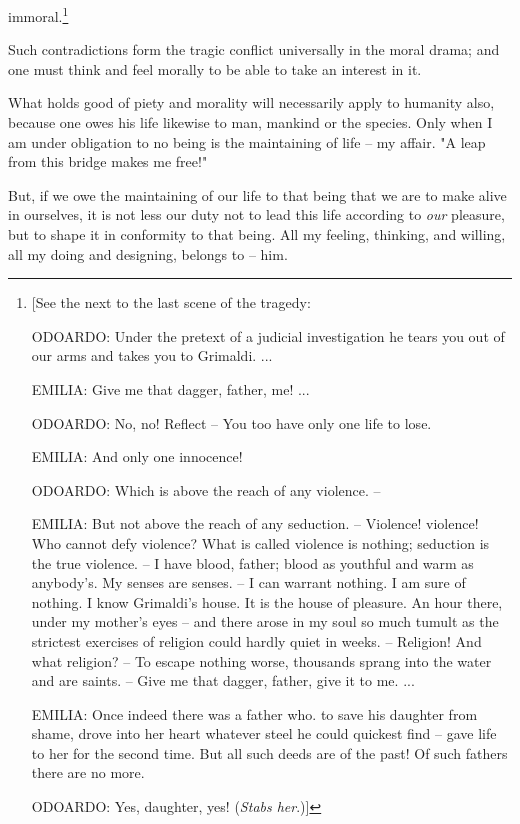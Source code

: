 immoral.\footnote{[See the next to the last scene of the tragedy:

ODOARDO: Under the pretext of a judicial investigation he tears you out of our 
arms and takes you to Grimaldi. ...

EMILIA: Give me that dagger, father, me! ...

ODOARDO: No, no! Reflect -- You too have only one life to lose.

EMILIA: And only one innocence!

ODOARDO: Which is above the reach of any violence. --

EMILIA: But not above the reach of any seduction. -- Violence! violence! Who 
cannot defy violence? What is called violence is nothing; seduction is the 
true violence. -- I have blood, father; blood as youthful and warm as 
anybody's. My senses are senses. -- I can warrant nothing. I am sure of 
nothing. I know Grimaldi's house. It is the house of pleasure. An hour there, 
under my mother's eyes -- and there arose in my soul so much tumult as the 
strictest exercises of religion could hardly quiet in weeks. -- Religion! And 
what religion? -- To escape nothing worse, thousands sprang into the water and 
are saints. -- Give me that dagger, father, give it to me. ...

EMILIA: Once indeed there was a father who. to save his daughter from shame, 
drove into her heart whatever steel he could quickest find -- gave life to her 
for the second time. But all such deeds are of the past! Of such fathers there 
are no more.

ODOARDO: Yes, daughter, yes! (\textit{Stabs her}.)]

}

Such contradictions form the tragic conflict universally in the moral drama; 
and one must think and feel morally to be able to take an interest in it.

What holds good of piety and morality will necessarily apply to humanity also, 
because one owes his life likewise to man, mankind or the species. Only when I 
am under obligation to no being is the maintaining of life -- my affair. "{}A 
leap from this bridge makes me free!"{}

But, if we owe the maintaining of our life to that being that we are to make 
alive in ourselves, it is not less our duty not to lead this life according to 
\textit{our} pleasure, but to shape it in conformity to that being. All my 
feeling, thinking, and willing, all my doing and designing, belongs to -- him.

